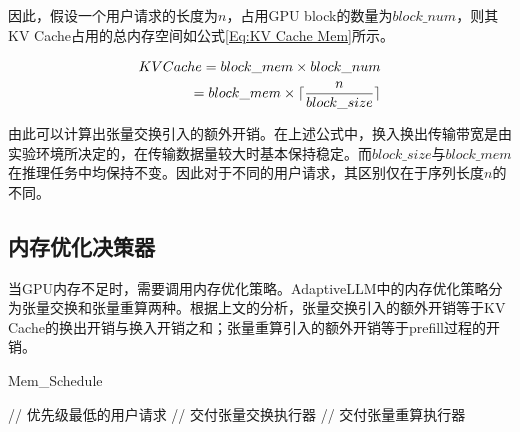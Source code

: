 因此，假设一个用户请求的长度为$n$，占用GPU block的数量为$block\_num$，则其KV Cache占用的总内存空间如公式\ref{Eq:KV Cache Mem}所示。

\begin{equation}
  \begin{aligned}
    KVCache = block\_mem \times block\_num  \\ =  block\_mem \times \lceil \frac{n}{block\_size} \rceil
  \end{aligned}
  \label{Eq:KV Cache Mem}
  \setlength{\abovedisplayskip}{0ex}
  \setlength{\belowdisplayskip}{2ex}
\end{equation}

由此可以计算出张量交换引入的额外开销。在上述公式中，换入换出传输带宽是由实验环境所决定的，在传输数据量较大时基本保持稳定。而$block\_size$与$block\_mem$在推理任务中均保持不变。因此对于不同的用户请求，其区别仅在于序列长度$n$的不同。

\subsection{内存优化决策器}

当GPU内存不足时，需要调用内存优化策略。AdaptiveLLM中的内存优化策略分为张量交换和张量重算两种。根据上文的分析，张量交换引入的额外开销等于KV Cache的换出开销与换入开销之和；张量重算引入的额外开销等于prefill过程的开销。\par

\begin{algorithm}
  \caption{Mem\_Schedule}
  \label{Code:内存优化决策器工作流程}
  \small
  \begin{spacing}{1.2}
    \begin{algorithmic}[1]
         \hfill {// 优先级最低的用户请求}
          \ELSE
          \ENDIF
        \ELSE
        \ENDIF
           \hfill {// 交付张量交换执行器}
        \ELSE
           \hfill {// 交付张量重算执行器}
        \ENDIF
      \ENDWHILE
    \end{algorithmic}
  \end{spacing}
\end{algorithm}

